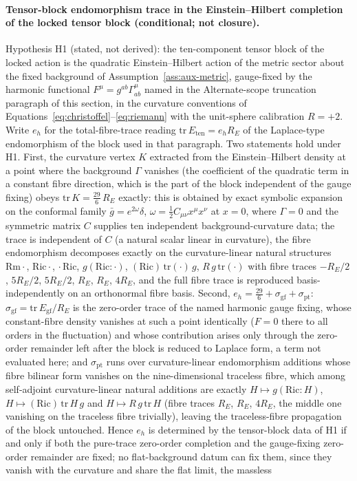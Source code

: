\paragraph{Tensor-block endomorphism trace in the Einstein--Hilbert completion of the locked tensor block (conditional; not closure).} Hypothesis H1 (stated, not derived): the ten-component tensor block of the locked action is the quadratic Einstein--Hilbert action of the metric sector about the fixed background of Assumption~\ref{ass:aux-metric}, gauge-fixed by the harmonic functional \(F^\mu=g^{ab}\Gamma^\mu_{ab}\) named in the Alternate-scope truncation paragraph of this section, in the curvature conventions of Equations~\eqref{eq:christoffel}--\eqref{eq:riemann} with the unit-sphere calibration \(R=+2\). Write \(e_h\) for the total-fibre-trace reading \(\mathrm{tr}\,E_{\mathrm{ten}}=e_h R_E\) of the Laplace-type endomorphism of the block used in that paragraph. Two statements hold under H1. First, the curvature vertex \(K\) extracted from the Einstein--Hilbert density at a point where the background \(\Gamma\) vanishes (the coefficient of the quadratic term in a constant fibre direction, which is the part of the block independent of the gauge fixing) obeys \(\mathrm{tr}\,K=\tfrac{29}{6}\,R_E\) exactly: this is obtained by exact symbolic expansion on the conformal family \(\bar{g}=e^{2\omega}\delta\), \(\omega=\tfrac{1}{2}C_{\mu\nu}x^\mu x^\nu\) at \(x=0\), where \(\Gamma=0\) and the symmetric matrix \(C\) supplies ten independent background-curvature data; the trace is independent of \(C\) (a natural scalar linear in curvature), the fibre endomorphism decomposes exactly on the curvature-linear natural structures \(\mathrm{Rm}\cdot\), \(\mathrm{Ric}\cdot\), \(\cdot\,\mathrm{Ric}\), \(g(\mathrm{Ric}:\cdot)\), \((\mathrm{Ric})\,\mathrm{tr}(\cdot)\,g\), \(R\,g\,\mathrm{tr}(\cdot)\) with fibre traces \(-R_E/2\), \(5R_E/2\), \(5R_E/2\), \(R_E\), \(R_E\), \(4R_E\), and the full fibre trace is reproduced basis-independently on an orthonormal fibre basis. Second, \(e_h=\tfrac{29}{6}+\sigma_{\mathrm{gf}}+\sigma_{\mathrm{pt}}\): \(\sigma_{\mathrm{gf}}=\mathrm{tr}\,E_{\mathrm{gf}}/R_E\) is the zero-order trace of the named harmonic gauge fixing, whose constant-fibre density vanishes at such a point identically (\(F=0\) there to all orders in the fluctuation) and whose contribution arises only through the zero-order remainder left after the block is reduced to Laplace form, a term not evaluated here; and \(\sigma_{\mathrm{pt}}\) runs over curvature-linear endomorphism additions whose fibre bilinear form vanishes on the nine-dimensional traceless fibre, which among self-adjoint curvature-linear natural additions are exactly \(H\mapsto g(\mathrm{Ric}:H)\), \(H\mapsto(\mathrm{Ric})\,\mathrm{tr}\,H\,g\) and \(H\mapsto R\,g\,\mathrm{tr}\,H\) (fibre traces \(R_E\), \(R_E\), \(4R_E\), the middle one vanishing on the traceless fibre trivially), leaving the traceless-fibre propagation of the block untouched. Hence \(e_h\) is determined by the tensor-block data of H1 if and only if both the pure-trace zero-order completion and the gauge-fixing zero-order remainder are fixed; no flat-background datum can fix them, since they vanish with the curvature and share the flat limit, the massless 